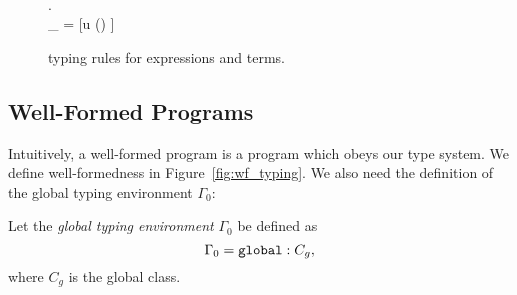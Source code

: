 \begin{figure}[]
    \vspace{0.5em}

    { \andalso {} \\
    \forall {} \in {}. \; \\
    \Gamma_{} = [u \mapsto \CellType \mid () \in {}]\\
    }
    {  }

  \caption{\RACL{} typing rules for expressions and terms.}
  \label{fig:expr_typing}
\end{figure}

\subsection{Well-Formed Programs}%
\label{sub:well_formed_programs}

Intuitively, a well-formed program is a program which obeys our type system. We
define well-formedness in Figure~\ref{fig:wf_typing}. We also need the
definition of the global typing environment $\Gamma_0$:
\begin{definition}
  Let the \emph{global typing environment} $\Gamma_0$ be defined as 
  \begin{equation*}
    \Gamma_0 = \mbox{\mdseries\texttt{global}} : C_g,
  \end{equation*}
  where $C_g$ is the global class.
\end{definition}

